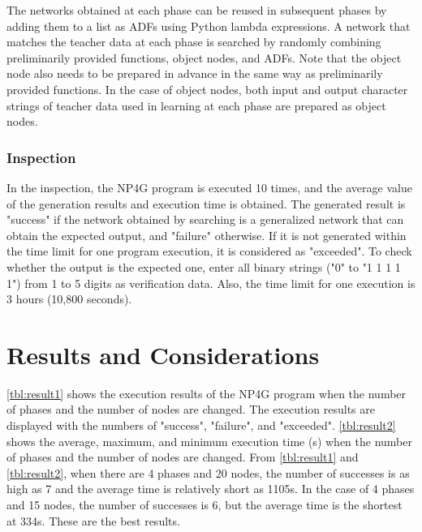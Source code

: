 \documentclass{article}
\begin{document}
The networks obtained at each phase can be reused in subsequent phases by adding them to a list as ADFs using Python lambda expressions.
A network that matches the teacher data at each phase is searched by randomly combining preliminarily provided functions, object nodes, and ADFs.
Note that the object node also needs to be prepared in advance in the same way as preliminarily provided functions.
In the case of object nodes, both input and output character strings of teacher data used in learning at each phase are prepared as object nodes.

\subsubsection {Inspection}
In the inspection, the NP4G program is executed 10 times, and the average value of the generation results and execution time is obtained.
The generated result is "success" if the network obtained by searching is a generalized network that can obtain the expected output, and "failure" otherwise. If it is not generated within the time limit for one program execution, it is considered as "exceeded".
To check whether the output is the expected one, enter all binary strings ("0" to "1 1 1 1 1") from 1 to 5 digits as verification data.
Also, the time limit for one execution is 3 hours (10,800 seconds).

\section {Results and Considerations}
\ref{tbl:result1} shows the execution results of the NP4G program when the number of phases and the number of nodes are changed.
The execution results are displayed with the numbers of "success", "failure", and "exceeded".
\ref{tbl:result2} shows the average, maximum, and minimum execution time (s) when the number of phases and the number of nodes are changed.
From \ref{tbl:result1} and \ref{tbl:result2}, when there are 4 phases and 20 nodes, the number of successes is as high as 7 and the average time is relatively short as 1105s.
In the case of 4 phases and 15 nodes, the number of successes is 6, but the average time is the shortest at 334s.
These are the best results.
\end{document}
